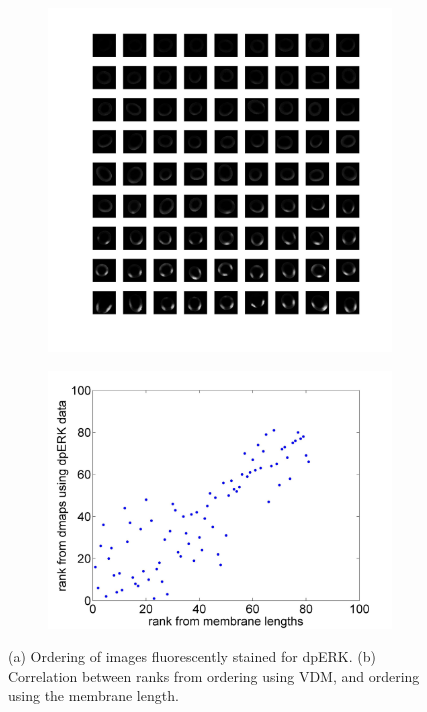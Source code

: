 \documentclass[twocolumn, 11pt]{article}
\begin{document}
\begin{figure}[h]
\begin{subfigure}[c]{0.45\textwidth}
\includegraphics[width=\textwidth]{dpERK_array}
\caption{}
\end{subfigure}
\begin{subfigure}[c]{0.5\textwidth}
\includegraphics[width=\textwidth]{dpERK_rank_corr}
\caption{}
\end{subfigure}
\caption{(a) Ordering of images fluorescently stained for dpERK. (b) Correlation between ranks from ordering using VDM, and ordering using the membrane length.}
\label{fig:dpERK}
\end{figure}
\end{document}
